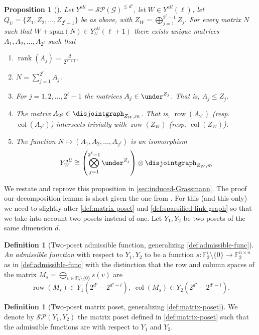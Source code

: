 \documentclass[10pt,a4paper]{article}
\newcommand{\prettyref}[1]{\cref{#1}}
\newtheorem{proposition}[theorem]{Proposition}
\theoremstyle{definition}
\newtheorem{definition}[theorem]{Definition}
\theoremstyle{remark}
\newcommand{\set}[1]{\{#1\}}
\def\sp{\mathrm{ span}}
\newcommand{\F}{\mathbb{F}}
\DeclareMathOperator{\rank}{rank}
\DeclareMathOperator{\row}{row}
\DeclareMathOperator{\col}{col}
\renewcommand{\leq}{\leqslant}
\numberwithin{equation}{section}
\let\pref=\prettyref
\def\Gr{\mathcal{G}}
\def\Y{Y}
\def\diml{d}
\def\dimlin{{\diml}}
\def\dimlout{\diml'}
\def\dimloutfull{{\diml'}}
\def\dimm{\ell}
\def\M{\mathcal{SP}}
\def\Mgras{Y^{all}}
\begin{document}
\begin{proposition}[{\cite[Lemmas 59,61,62]{Golowich2023}}] \label{prop:louis-decomposition}
    Let \(\Mgras = \M(\Gr)^{\leq \dimlout}\), let \(W \in \Mgras(\dimm)\), let \(Q_U = \set{Z_1,Z_2,\dots,Z_{2^{\dimm}-1}}\) be as above, with \(Z_W = \bigoplus_{j=1}^{2^\dimm -1} Z_j\). For every matrix \(N\) such that \(W + \sp(N) \in \Mgras_U(\dimm+1)\) there exists unique matrices \(A_1,A_2,\dots,A_{2^{\dimm}}\) such that
    \begin{enumerate}
            \item \(\rank(A_j) = \frac{\dimlin}{2^{\dimm+1}}\).
            \item \(N = \sum_{j=1}^{2^\dimm} A_{j}\).
            \item For \(j=1,2,\dots,2^\dimm-1\) the matrices \(A_j \in \under^{Z_j}\). That is, \(A_j \leq Z_j\).
            \item The matrix \(A_{2^{\dimm}} \in \disjointgraph_{Z_W,m}\). That is, \(\row(A_{2^\dimm})\) (resp. \(\col(A_{2^\dimm})\)) intersects trivially with \(\row(Z_W)\) (resp. \(\col(Z_W)\)).
            \item The function \(N \mapsto (A_1,A_2,\dots,A_{2^\dimm})\) is an isomorphism 
            \[\Mgras_W \cong \left ( \bigotimes_{j=1}^{2^\dimm -1} \under^{Z_j} \right ) \otimes \disjointgraph_{Z_W,m}\]
    \end{enumerate}
\end{proposition}

We restate and reprove this proposition in \pref{sec:induced-Grassmann}. The proof our decomposition lemma is short given the one from \cite{Golowich2023}. For this (and this only) we need to slightly alter \pref{def:matrix-poset} and \pref{def:sparsified-link-graph} so that we take into account two posets instead of one. Let \(\Y_1,\Y_2\) be two posets of the same dimension \(\dimlin\).
\begin{definition}[Two-poset admissible function, generalizing \pref{def:admissible-func}]
    \emph{An admissible function} with respect to \(\Y_1,\Y_2\) to be a function \(s: \F_2^i \setminus \set{0} \to \F_2^{n \times n}\) as in \pref{def:admissible-func} with the distinction that the row and column spaces of the matrix \(M_s = \bigoplus_{v \in \F_2^i \setminus \set{0}}s(v)\) are 
    \[\row(M_s) \in \Y_1(2^{\dimloutfull} - 2^{\dimloutfull - i}), \;\col(M_s) \in \Y_2(2^{\dimloutfull} - 2^{\dimloutfull - i}).\]
\end{definition}
\begin{definition}[Two-poset matrix poset, generalizing \pref{def:matrix-poset}]
    We denote by \(\M(\Y_1,\Y_2)\) the matrix poset defined in \pref{def:matrix-poset} such that the admissible functions are with respect to \(\Y_1\) and \(\Y_2\).
\end{definition}
\end{document}
